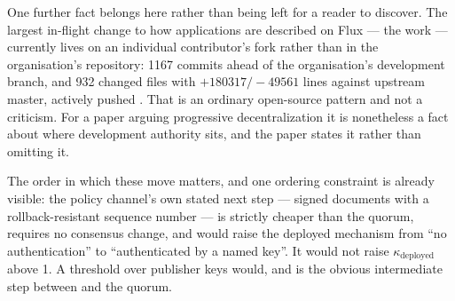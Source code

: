 One further fact belongs here rather than being left for a reader to discover. The largest in-flight
change to how applications are described on Flux — the  work — currently lives on an
individual contributor's fork rather than in the organisation's repository: \num{1167} commits ahead
of the organisation's development branch, and 932
changed files with $+\num{180317}/-\num{49561}$ lines against upstream master, actively pushed
.
That is an ordinary open-source pattern and not a criticism. For a paper arguing progressive
decentralization it is nonetheless a fact about where development authority sits, and the paper
states it rather than omitting it.

The order in which these move matters, and one ordering constraint is already visible: the policy
channel's own stated next step — signed documents with a rollback-resistant sequence number
 — is strictly cheaper than the quorum, requires
no consensus change, and would raise the deployed mechanism from ``no authentication'' to
``authenticated by a named key''. It would not raise $\kappa_{\mathrm{deployed}}$ above 1. A
threshold over publisher keys would, and is the obvious intermediate step between
 and the quorum.

